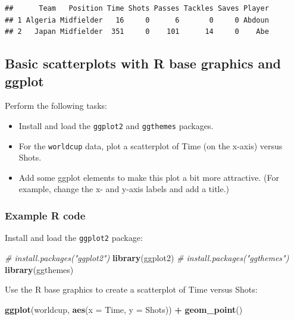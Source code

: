 \documentclass[]{book}
\makeatletter
\newenvironment{Shaded}{\begin{snugshade}}{\end{snugshade}}
\newcommand{\KeywordTok}[1]{\textcolor[rgb]{0.13,0.29,0.53}{\textbf{#1}}}
\newcommand{\DataTypeTok}[1]{\textcolor[rgb]{0.13,0.29,0.53}{#1}}
\newcommand{\StringTok}[1]{\textcolor[rgb]{0.31,0.60,0.02}{#1}}
\newcommand{\CommentTok}[1]{\textcolor[rgb]{0.56,0.35,0.01}{\textit{#1}}}
\newcommand{\OperatorTok}[1]{\textcolor[rgb]{0.81,0.36,0.00}{\textbf{#1}}}
\newcommand{\NormalTok}[1]{#1}
\providecommand{\tightlist}{%
  \setlength{\itemsep}{0pt}\setlength{\parskip}{0pt}}
\newenvironment{kframe}{%
\medskip{}
\setlength{\fboxsep}{.8em}
 \def\at@end@of@kframe{}%
 \ifinner\ifhmode%
  \def\at@end@of@kframe{\end{minipage}}%
  \begin{minipage}{\columnwidth}%
 \fi\fi%
 \def\FrameCommand##1{\hskip\@totalleftmargin \hskip-\fboxsep
 \colorbox{shadecolor}{##1}\hskip-\fboxsep
     \hskip-\linewidth \hskip-\@totalleftmargin \hskip\columnwidth}%
 \MakeFramed {\advance\hsize-\width
   \@totalleftmargin\z@ \linewidth\hsize
   \@setminipage}}%
 {\par\unskip\endMakeFramed%
 \at@end@of@kframe}
\renewenvironment{Shaded}{\begin{kframe}}{\end{kframe}}
\theoremstyle{definition}
\theoremstyle{definition}
\theoremstyle{definition}
\theoremstyle{remark}
\makeatother
\begin{document}
\begin{verbatim}
##      Team   Position Time Shots Passes Tackles Saves Player
## 1 Algeria Midfielder   16     0      6       0     0 Abdoun
## 2   Japan Midfielder  351     0    101      14     0    Abe
\end{verbatim}

\subsection{Basic scatterplots with R base graphics and
ggplot}\label{basic-scatterplots-with-r-base-graphics-and-ggplot}

Perform the following tasks:

\begin{itemize}
\tightlist
\item
  Install and load the \texttt{ggplot2} and \texttt{ggthemes} packages.
\item
  For the \texttt{worldcup} data, plot a scatterplot of Time (on the
  x-axis) versus Shots.
\item
  Add some ggplot elements to make this plot a bit more attractive. (For
  example, change the x- and y-axis labels and add a title.)
\end{itemize}

\subsubsection{Example R code}\label{example-r-code-5}

Install and load the \texttt{ggplot2} package:

\begin{Shaded}
\begin{Highlighting}[]
\CommentTok{# install.packages("ggplot2")}
\KeywordTok{library}\NormalTok{(ggplot2)}
\CommentTok{# install.packages("ggthemes")}
\KeywordTok{library}\NormalTok{(ggthemes)}
\end{Highlighting}
\end{Shaded}

Use the R base graphics to create a scatterplot of Time versus Shots:

\begin{Shaded}
\begin{Highlighting}[]
\KeywordTok{ggplot}\NormalTok{(worldcup, }\KeywordTok{aes}\NormalTok{(}\DataTypeTok{x =}\NormalTok{ Time, }\DataTypeTok{y =}\NormalTok{ Shots)) }\OperatorTok{+}\StringTok{ }
\StringTok{        }\KeywordTok{geom_point}\NormalTok{()}
\end{Highlighting}
\end{Shaded}
\end{document}
